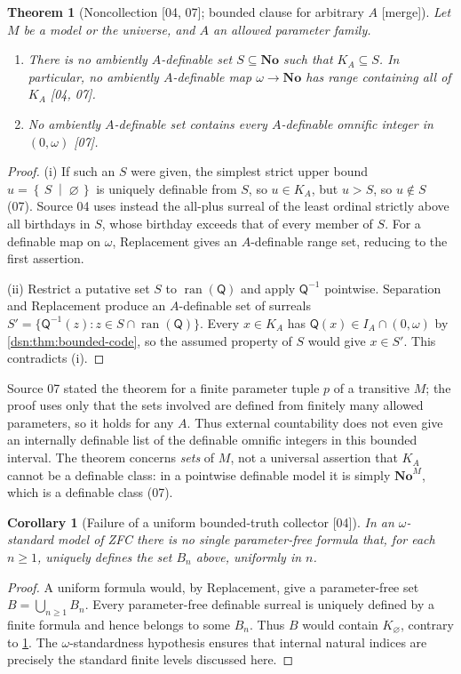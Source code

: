 \documentclass[11pt,a4paper]{article}
\numberwithin{equation}{section}
\newtheorem{theorem}{Theorem}[section]
\newtheorem{corollary}[corollary]{Corollary}
\theoremstyle{definition}
\theoremstyle{remark}
\newcommand{\No}{\mathbf{No}}
\newcommand{\ran}{\operatorname{ran}}
\newcommand{\Mc}{\mathsf Q}
\newcommand{\cut}[2]{\left\{\,#1\;\middle|\;#2\,\right\}}
\newcommand{\src}[1]{\textup{\textsf{\small[#1]}}}
\newcommand{\mergetag}{\textup{\textsf{\small[merge]}}}
\begin{document}
\begin{theorem}[Noncollection \src{04, 07}; bounded clause for arbitrary $A$ \mergetag]
\label{dsn:thm:noncollection}
Let $M$ be a model or the universe, and $A$ an allowed parameter family.
\begin{enumerate}[label=\textup{(\roman*)}]
\item There is no ambiently $A$-definable set $S\subseteq\No$ such that
$K_A\subseteq S$. In particular, no ambiently $A$-definable map
$\omega\to\No$ has range containing all of $K_A$ \src{04, 07}.
\item No ambiently $A$-definable set contains every $A$-definable
omnific integer in $(0,\omega)$ \src{07}.
\end{enumerate}
\end{theorem}
\begin{proof}
(i) If such an $S$ were given, the simplest strict upper bound
$u=\cut S\varnothing$ is uniquely definable from $S$, so $u\in K_A$, but
$u>S$, so $u\notin S$ (07). Source 04 uses instead the all-plus surreal of
the least ordinal strictly above all birthdays in $S$, whose birthday
exceeds that of every member of $S$. For a definable map on $\omega$,
Replacement gives an $A$-definable range set, reducing to the first
assertion.

(ii) Restrict a putative set $S$ to $\ran(\Mc)$ and apply $\Mc^{-1}$
pointwise. Separation and Replacement produce an $A$-definable set of
surreals $S'=\{\Mc^{-1}(z):z\in S\cap\ran(\Mc)\}$. Every $x\in K_A$ has
$\Mc(x)\in I_A\cap(0,\omega)$ by \cref{dsn:thm:bounded-code}, so the assumed
property of $S$ would give $x\in S'$. This contradicts (i).
\end{proof}

Source 07 stated the theorem for a finite parameter tuple $p$ of a
transitive $M$; the proof uses only that the sets involved are defined from
finitely many allowed parameters, so it holds for any $A$. Thus external
countability does not even give an internally definable list of the
definable omnific integers in this bounded interval. The theorem concerns
\emph{sets} of $M$, not a universal assertion that $K_A$ cannot be a
definable class: in a pointwise definable model it is simply $\No^M$,
which is a definable class (07).

\begin{corollary}[Failure of a uniform bounded-truth collector \src{04}]
\label{dsn:cor:nouniformBn}
In an $\omega$-standard model of ZFC there is no single
parameter-free formula that, for each $n\geq1$, uniquely defines
the set $B_n$ above, uniformly in $n$.
\end{corollary}
\begin{proof}
A uniform formula would, by Replacement, give a parameter-free set
$B=\bigcup_{n\geq1}B_n$. Every parameter-free definable surreal is
uniquely defined by a finite formula and hence belongs to some
$B_n$. Thus $B$ would contain $K_\varnothing$, contrary to
\cref{dsn:thm:noncollection}. The $\omega$-standardness
hypothesis ensures that internal natural indices are precisely the
standard finite levels discussed here.
\end{proof}
\end{document}
